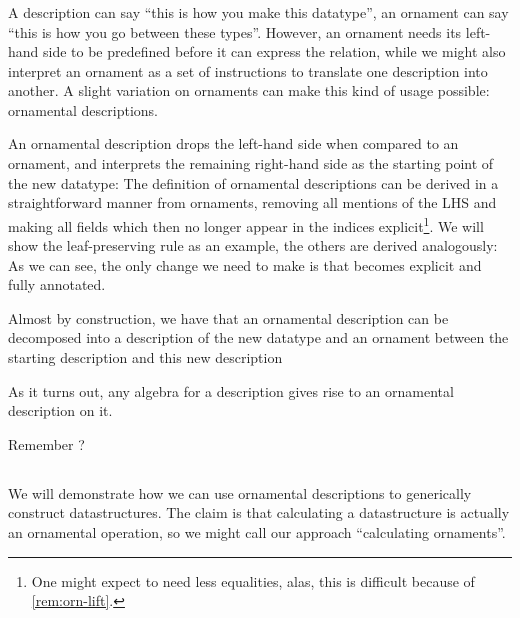 \subsubsection{}
A description can say ``this is how you make this datatype'', an ornament can say ``this is how you go between these types''. However, an ornament needs its left-hand side to be predefined before it can express the relation, while we might also interpret an ornament as a set of instructions to translate one description into another. A slight variation on ornaments can make this kind of usage possible: ornamental descriptions.

An ornamental description drops the left-hand side when compared to an ornament, and interprets the remaining right-hand side as the starting point of the new datatype:
The definition of ornamental descriptions can be derived in a straightforward manner from ornaments, removing all mentions of the LHS and making all fields which then no longer appear in the indices explicit\footnote{One might expect to need less equalities, alas, this is difficult because of \autoref{rem:orn-lift}.}. We will show the leaf-preserving rule as an example, the others are derived analogously:
As we can see, the only change we need to make is that  becomes explicit and fully annotated.

Almost by construction, we have that an ornamental description can be decomposed into a description of the new datatype
and an ornament between the starting description and this new description


As it turns out, any algebra for a description gives rise to an ornamental description on it.

Remember ?





\subsection{}\label{ssec:trieo}
We will demonstrate how we can use ornamental descriptions to generically construct datastructures. The claim is that calculating a datastructure is actually an ornamental operation, so we might call our approach ``calculating ornaments''. 

